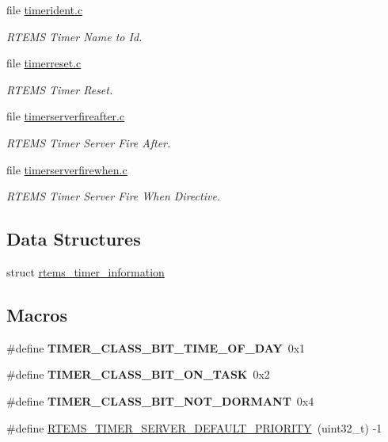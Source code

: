 \begin{DoxyCompactItemize}
file \mbox{\hyperlink{timerident_8c}{timerident.\+c}}
\begin{DoxyCompactList}\small\item\em R\+T\+E\+MS Timer Name to Id. \end{DoxyCompactList}\item 
file \mbox{\hyperlink{timerreset_8c}{timerreset.\+c}}
\begin{DoxyCompactList}\small\item\em R\+T\+E\+MS Timer Reset. \end{DoxyCompactList}\item 
file \mbox{\hyperlink{timerserverfireafter_8c}{timerserverfireafter.\+c}}
\begin{DoxyCompactList}\small\item\em R\+T\+E\+MS Timer Server Fire After. \end{DoxyCompactList}\item 
file \mbox{\hyperlink{timerserverfirewhen_8c}{timerserverfirewhen.\+c}}
\begin{DoxyCompactList}\small\item\em R\+T\+E\+MS Timer Server Fire When Directive. \end{DoxyCompactList}\end{DoxyCompactItemize}
\subsection*{Data Structures}
\begin{DoxyCompactItemize}
\item 
struct \mbox{\hyperlink{structrtems__timer__information}{rtems\+\_\+timer\+\_\+information}}
\end{DoxyCompactItemize}
\subsection*{Macros}
\begin{DoxyCompactItemize}
\item 
\mbox{\label{group__ClassicTimer_gad94e72cc7c778a489fad6263b85bfaae}} 
\#define {\bfseries T\+I\+M\+E\+R\+\_\+\+C\+L\+A\+S\+S\+\_\+\+B\+I\+T\+\_\+\+T\+I\+M\+E\+\_\+\+O\+F\+\_\+\+D\+AY}~0x1
\item 
\mbox{\label{group__ClassicTimer_gae3bb2bec9103b35bebc32f14b2bc88ae}} 
\#define {\bfseries T\+I\+M\+E\+R\+\_\+\+C\+L\+A\+S\+S\+\_\+\+B\+I\+T\+\_\+\+O\+N\+\_\+\+T\+A\+SK}~0x2
\item 
\mbox{\label{group__ClassicTimer_ga5ef820cc6c8d5c2af3a1114fe56dc1aa}} 
\#define {\bfseries T\+I\+M\+E\+R\+\_\+\+C\+L\+A\+S\+S\+\_\+\+B\+I\+T\+\_\+\+N\+O\+T\+\_\+\+D\+O\+R\+M\+A\+NT}~0x4
\item 
\#define \mbox{\hyperlink{group__ClassicTimer_gaf60a142a5e7a0d9b0708cb3a6abdffce}{R\+T\+E\+M\+S\+\_\+\+T\+I\+M\+E\+R\+\_\+\+S\+E\+R\+V\+E\+R\+\_\+\+D\+E\+F\+A\+U\+L\+T\+\_\+\+P\+R\+I\+O\+R\+I\+TY}}~(uint32\+\_\+t) -\/1
\end{DoxyCompactItemize}
